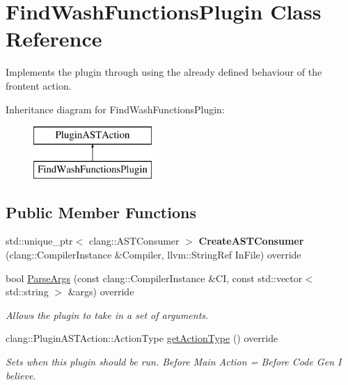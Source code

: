 \hypertarget{classFindWashFunctionsPlugin}{}\section{Find\+Wash\+Functions\+Plugin Class Reference}
\label{classFindWashFunctionsPlugin}


Implements the plugin through using the already defined behaviour of the frontent action.  


Inheritance diagram for Find\+Wash\+Functions\+Plugin\+:\begin{figure}[H]
\begin{center}
\leavevmode
\includegraphics[height=2.000000cm]{classFindWashFunctionsPlugin}
\end{center}
\end{figure}
\subsection*{Public Member Functions}
\begin{DoxyCompactItemize}
\item 
\mbox{\label{classFindWashFunctionsPlugin_acbaba39a9d96878d684361427c0d92ad}} 
std\+::unique\+\_\+ptr$<$ clang\+::\+A\+S\+T\+Consumer $>$ {\bfseries Create\+A\+S\+T\+Consumer} (clang\+::\+Compiler\+Instance \&Compiler, llvm\+::\+String\+Ref In\+File) override
\item 
\mbox{\label{classFindWashFunctionsPlugin_a5a26a021392c239258217236f1016a20}} 
bool \mbox{\hyperlink{classFindWashFunctionsPlugin_a5a26a021392c239258217236f1016a20}{Parse\+Args}} (const clang\+::\+Compiler\+Instance \&CI, const std\+::vector$<$ std\+::string $>$ \&args) override
\begin{DoxyCompactList}\small\item\em Allows the plugin to take in a set of arguments. \end{DoxyCompactList}\item 
\mbox{\label{classFindWashFunctionsPlugin_a6c0b54d000be41e28df04e36bbde4561}} 
clang\+::\+Plugin\+A\+S\+T\+Action\+::\+Action\+Type \mbox{\hyperlink{classFindWashFunctionsPlugin_a6c0b54d000be41e28df04e36bbde4561}{get\+Action\+Type}} () override
\begin{DoxyCompactList}\small\item\em Sets when this plugin should be run. Before Main Action = Before Code Gen I believe. \end{DoxyCompactList}\end{DoxyCompactItemize}


